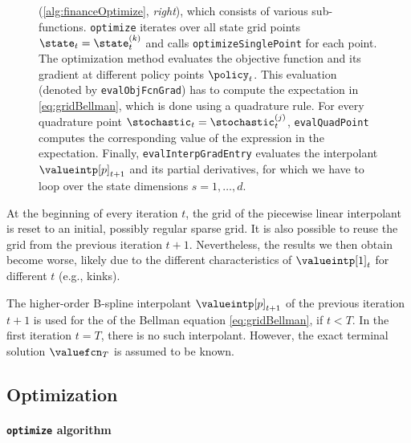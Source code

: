 \begin{figure}
{    (\cref{alg:financeOptimize}, \emph{right}),
    which consists of various sub-functions.
    \texttt{optimize} iterates over all state grid points
    $\state_t = \state_t^{(k)}$ and calls \texttt{optimizeSinglePoint}
    for each point.
    The optimization method evaluates the objective function and
    its gradient at different policy points $\policy_t$.
    This evaluation (denoted by \texttt{evalObjFcnGrad})
    has to compute the expectation in \cref{eq:gridBellman},
    which is done using a quadrature rule.
    For every quadrature point $\stochastic_t = \stochastic_t^{(j)}$,
    \texttt{evalQuadPoint} computes the corresponding value of
    the expression in the expectation.
    Finally, \texttt{evalInterpGradEntry} evaluates the interpolant
    $\valueintp[p]_{t+1}$ and its partial derivatives,
    for which we have to loop over the state dimensions $s = 1, \dotsc, d$.%
  }%
  \label{fig:structureSolveValueFunction}%
\end{figure}

At the beginning of every iteration $t$,
the grid of the piecewise linear interpolant is reset
to an initial, possibly regular sparse grid.
It is also possible to reuse the grid from the
previous iteration $t + 1$.
Nevertheless, the results we then obtain become worse,
likely due to the different characteristics of $\valueintp[1]_t$
for different $t$ (e.g., kinks).

The higher-order B-spline interpolant
$\valueintp[p]_{t+1}$ of the previous iteration $t+1$ is used
for the \rhs of the Bellman equation \eqref{eq:gridBellman},
if $t < T$.
In the first iteration $t = T$,
there is no such interpolant.
However,
the exact terminal solution $\valuefcn_T$ is assumed to be known.



\subsection{Optimization}
\label{sec:823optimization}

\paragraph{\texttt{optimize} algorithm}

